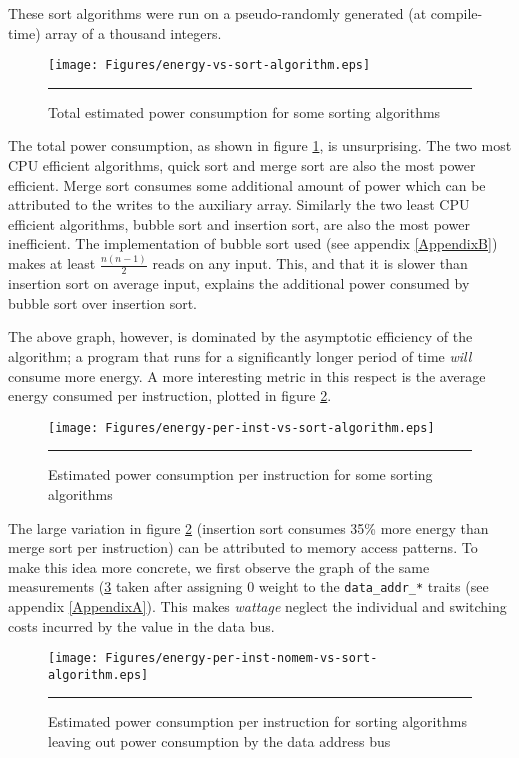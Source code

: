 These sort algorithms were run on a pseudo-randomly generated (at
compile-time) array of a thousand integers.

\begin{figure}[htbp]
  \centering
  \texttt{[image: Figures/energy-vs-sort-algorithm.eps]}
  \rule{35em}{0.5pt}
  \caption{Total estimated power consumption for some sorting algorithms}
  \label{fig:total-power-sort-algo}
\end{figure}

The total power consumption, as shown in figure
\ref{fig:total-power-sort-algo}, is unsurprising.  The two most CPU
efficient algorithms, quick sort and merge sort are also the most
power efficient.  Merge sort consumes some additional amount of power
which can be attributed to the writes to the auxiliary array.
Similarly the two least CPU efficient algorithms, bubble sort and
insertion sort, are also the most power inefficient.  The
implementation of bubble sort used (see appendix \ref{AppendixB})
makes at least $\frac{n (n - 1)}{2}$ reads on any input.  This, and
that it is slower than insertion sort on average input, explains the
additional power consumed by bubble sort over insertion sort.

The above graph, however, is dominated by the asymptotic efficiency of
the algorithm; a program that runs for a significantly longer period
of time \textit{will} consume more energy.  A more interesting metric
in this respect is the average energy consumed per instruction,
plotted in figure \ref{fig:power-per-inst-sort-algo}.

\begin{figure}[htbp]
  \centering
  \texttt{[image: Figures/energy-per-inst-vs-sort-algorithm.eps]}
  \rule{35em}{0.5pt}
  \caption{Estimated power consumption per instruction for some sorting algorithms}
  \label{fig:power-per-inst-sort-algo}
\end{figure}

The large variation in figure \ref{fig:power-per-inst-sort-algo}
(insertion sort consumes 35\% more energy than merge sort per
instruction) can be attributed to memory access patterns.  To make
this idea more concrete, we first observe the graph of the same
measurements (\ref{fig:power-per-inst-nomem-sort-algo} taken after
assigning 0 weight to the \texttt{data\_addr\_*} traits (see appendix
\ref{AppendixA}).  This makes \textit{wattage} neglect the individual
and switching costs incurred by the value in the data bus.

\begin{figure}[htbp]
  \centering
  \texttt{[image: Figures/energy-per-inst-nomem-vs-sort-algorithm.eps]}
  \rule{35em}{0.5pt}
  \caption{Estimated power consumption per instruction for sorting
    algorithms leaving out power consumption by the data address bus}
  \label{fig:power-per-inst-nomem-sort-algo}
\end{figure}

